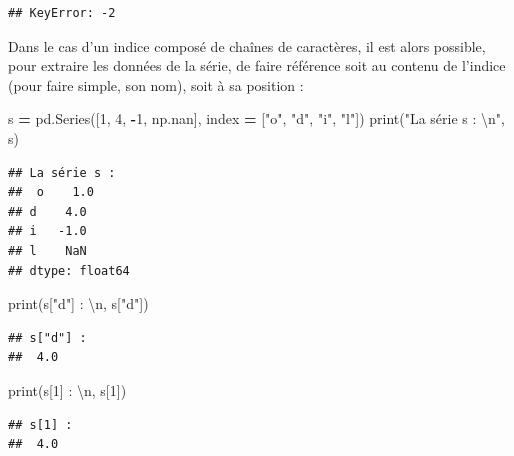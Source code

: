 \documentclass[
  12pt,
]{book}
\newenvironment{Shaded}{\begin{snugshade}}{\end{snugshade}}
\newcommand{\BuiltInTok}[1]{#1}
\newcommand{\CharTok}[1]{\textcolor[rgb]{0.31,0.60,0.02}{#1}}
\newcommand{\DecValTok}[1]{\textcolor[rgb]{0.00,0.00,0.81}{#1}}
\newcommand{\NormalTok}[1]{#1}
\newcommand{\OperatorTok}[1]{\textcolor[rgb]{0.81,0.36,0.00}{\textbf{#1}}}
\newcommand{\StringTok}[1]{\textcolor[rgb]{0.31,0.60,0.02}{#1}}
\numberwithin{equation}{section}
\numberwithin{countremarque}{section}
\begin{document}
\begin{lstlisting}
## KeyError: -2
\end{lstlisting}

Dans le cas d'un indice composé de chaînes de caractères, il est alors possible, pour extraire les données de la série, de faire référence soit au contenu de l'indice (pour faire simple, son nom), soit à sa position :

\begin{Shaded}
\begin{Highlighting}[]
\NormalTok{s }\OperatorTok{=}\NormalTok{ pd.Series([}\DecValTok{1}\NormalTok{, }\DecValTok{4}\NormalTok{, }\OperatorTok{{-}}\DecValTok{1}\NormalTok{, np.nan],}
\NormalTok{             index }\OperatorTok{=}\NormalTok{ [}\StringTok{"o"}\NormalTok{, }\StringTok{"d"}\NormalTok{, }\StringTok{"i"}\NormalTok{, }\StringTok{"l"}\NormalTok{])}
\BuiltInTok{print}\NormalTok{(}\StringTok{"La série s : }\CharTok{\textbackslash{}n}\StringTok{"}\NormalTok{, s)}
\end{Highlighting}
\end{Shaded}

\begin{lstlisting}
## La série s : 
##  o    1.0
## d    4.0
## i   -1.0
## l    NaN
## dtype: float64
\end{lstlisting}

\begin{Shaded}
\begin{Highlighting}[]
\BuiltInTok{print}\NormalTok{(}\StringTok{\textquotesingle{}s["d"] : }\CharTok{\textbackslash{}n}\StringTok{\textquotesingle{}}\NormalTok{, s[}\StringTok{"d"}\NormalTok{])}
\end{Highlighting}
\end{Shaded}

\begin{lstlisting}
## s["d"] : 
##  4.0
\end{lstlisting}

\begin{Shaded}
\begin{Highlighting}[]
\BuiltInTok{print}\NormalTok{(}\StringTok{\textquotesingle{}s[1] : }\CharTok{\textbackslash{}n}\StringTok{\textquotesingle{}}\NormalTok{, s[}\DecValTok{1}\NormalTok{])}
\end{Highlighting}
\end{Shaded}

\begin{lstlisting}
## s[1] : 
##  4.0
\end{lstlisting}
\end{document}
